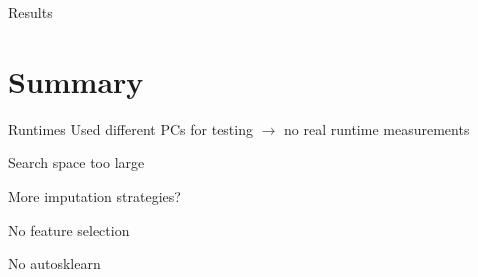 \documentclass[12pt]{beamer}
\begin{document}
\begin{frame}{Results}
\resizebox{\linewidth}{!}{}
\end{frame}

\section{Summary}
\begin{frame}
\begin{block}{Runtimes}
Used different PCs for testing $\rightarrow$ no real runtime measurements
\end{block}

Search space too large

More imputation strategies?

No feature selection

No autosklearn
\end{frame}
\end{document}
